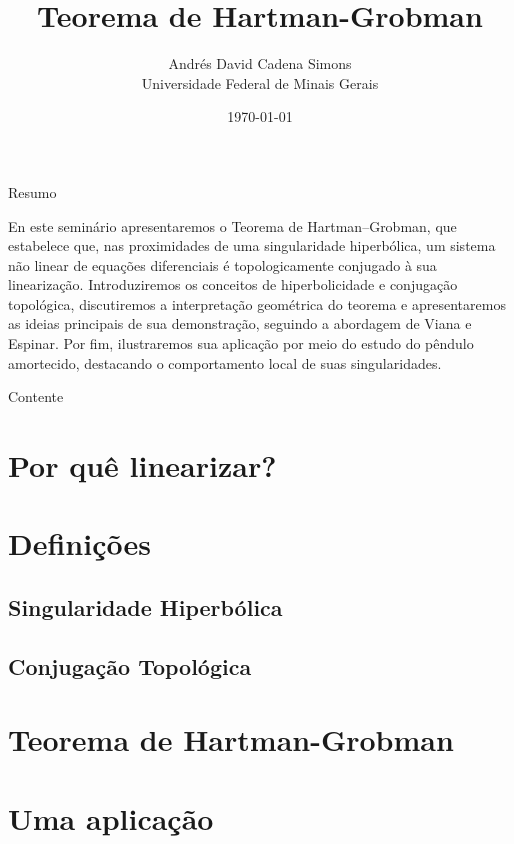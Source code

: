\documentclass{beamer}
\title{Teorema de Hartman-Grobman}
\author{\texorpdfstring{ 
Andrés David Cadena Simons\\
Universidade Federal de Minais Gerais}{A}}
\institute{ }
\date{\footnotesize \today}
\begin{document}
\begin{frame}
  \titlepage

\end{frame}

\begin{frame}{Resumo}
  \begin{block}{}
    En este seminário apresentaremos o Teorema de Hartman–Grobman, que estabelece que, nas proximidades de uma singularidade hiperbólica, um sistema não linear de equações diferenciais é topologicamente conjugado à sua linearização. Introduziremos os conceitos de hiperbolicidade e conjugação topológica, discutiremos a interpretação geométrica do teorema e apresentaremos as ideias principais de sua demonstração, seguindo a abordagem de Viana e Espinar. Por fim, ilustraremos sua aplicação por meio do estudo do pêndulo amortecido, destacando o comportamento local de suas singularidades.
  \end{block}
\end{frame}

\begin{frame}{Contente}
  \tableofcontents
\end{frame}

\section{Por quê linearizar?}


\section{Definições}
  \subsection{Singularidade Hiperbólica}
  
  \subsection{Conjugação Topológica}
  

\section{Teorema de Hartman-Grobman}


\section{Uma aplicação}

\end{document}
